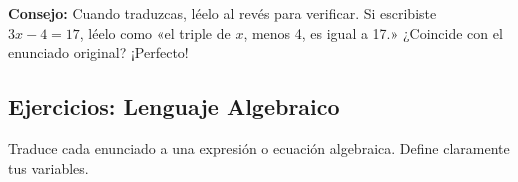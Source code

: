 \documentclass[12pt, a4paper]{article}
\begin{document}
\begin{cuadroadvertencia}
\textbf{Consejo:} Cuando traduzcas, léelo al revés para verificar. Si escribiste $3x - 4 = 17$, léelo como «el triple de $x$, menos 4, es igual a 17.» ¿Coincide con el enunciado original? ¡Perfecto!
\end{cuadroadvertencia}

\newpage

\subsection{Ejercicios: Lenguaje Algebraico}
Traduce cada enunciado a una expresión o ecuación algebraica. Define claramente tus variables.
\end{document}
